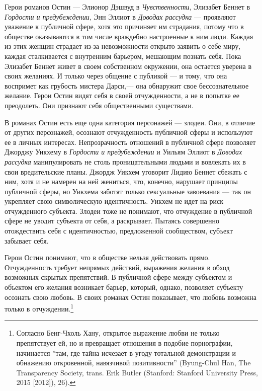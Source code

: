 \documentclass[12pt]{book}
\begin{document}
Герои романов Остин --- Элионор Дэшвуд в \textit{Чувственности}, Элизабет Беннет в \textit{Гордости и предубеждении}, Энн Эллиот в \textit{Доводах рассудка} --- проявляют уважение к публичной сфере, хотя это причиняет им страдания, потому что в обществе оказываются в том числе враждебно настроенные к ним люди. Каждая из этих женщин страдает из-за невозможности открыто заявить о себе миру, каждая сталкивается с внутренним барьером, мешающим познать себя. Пока Элизабет Беннет живет в своем собственном окружении, она остается уверена в своих желаниях. И только через общение с публикой --- и тому, что она воспримет как грубость мистера Дарси,--- она обнаружит свое бессознательное желание. Герои Остин видят себя в своей отчужденности, а не в попытке ее преодолеть. Они признают себя общественными существами.

В романах Остин есть еще одна категория персонажей --- злодеи. Они, в отличие от других персонажей, осознают отчужденность публичной сферы и используют ее в личных интересах. Непрозрачность отношений в публичной сфере позволяет Джорджу Уикхему в \textit{Гордости и предубеждении} и Уильям Эллиот в \textit{Доводах рассудка} манипулировать не столь проницательными людьми и вовлекать их в свои вредительские планы. Джордж Уикхем уговорит Лидию Беннет сбежать с ним, хотя и не намерен на ней жениться, что, конечно, нарушает принципы публичной сферы, но Уикхема заботят только сексуальные завоевания --- так он укрепляет свою символическую идентичность. Уикхем не идет на риск отчужденного субъекта. Злодеи тоже не понимают, что отчуждение в публичной сфере не уводит субъекта от себя, а раскрывает. Пытаясь совершенно отождествить себя с идентичностью, предложенной сообществом, субъект забывает себя.

Герои Остин понимают, что в обществе нельзя действовать прямо. Отчужденность требует непрямых действий, выражения желания в обход возможных скрытых препятствий. В публичной сфере между субъектом и объектом его желания возникает барьер, который, однако, позволяет субъекту осознать свою любовь. В своих романах Остин показывает, что любовь возможна только в отчуждении.\footnote{Согласно Бенг-Чхоль Хану, открытое выражение любви не только препятствует ей, но и превращает отношения в подобие порнографии, начинается ''там, где тайна исчезает в угоду тотальной демонстрации и обнажению откровенной, навязчивой позитивности'' (Byung-Chul Han, The Transparency Society, trans. Erik Butler (Stanford: Stanford University Press, 2015 [2012]), 26).}
\end{document}
